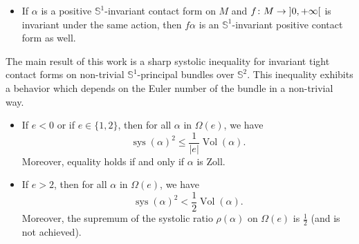 \documentclass[AHL,Unicode,longabstracts]{cedram}
\DeclareMathOperator{\vol}{Vol}
\DeclareMathOperator{\sys}{sys}
\newcommand{\bbS}{\mathbb{S}}
\renewcommand*{\to}{\mathchoice{\longrightarrow}{\rightarrow}{\rightarrow}{\rightarrow}}
\newcommand{\bbS}{\mathbb{S}}
\begin{document}
\begin{itemize}
\item If $\alpha$ is a positive $\bbS^1$-invariant contact form on $M$ and $f \colon M \to\mathopen{]}0, +\infty\mathclose{[}$ is invariant under the same action, then $f \alpha$ is an $\bbS^1$-invariant positive contact form as well.
\end{itemize}

The main result of this work is a sharp systolic inequality for invariant tight contact forms on non-trivial $\bbS^1$-principal bundles over $\bbS^2$. This inequality exhibits a behavior which depends on the Euler number of the bundle in a non-trivial way.

\begin{theo}\label{thm:ineg_sys_tight}
\leavevmode
\begin{itemize}
\item If $e < 0$ or if $e \in \{1,2\}$, then for all $\alpha$ in $\Omega(e)$, we have
\[
\sys(\alpha)^2 \leq \frac{1}{|e|} \vol(\alpha).
\]
Moreover, equality holds if and only if $\alpha$ is Zoll.
\item If $e > 2$, then for all $\alpha$ in $\Omega(e)$, we have
\[
\sys(\alpha)^2 < \frac{1}{2} \vol(\alpha).
\]
Moreover, the supremum of the systolic ratio $\rho(\alpha)$ on $\Omega(e)$ is $\frac{1}{2}$ (and is not achieved).
\end{itemize}
\end{theo}
\end{document}

